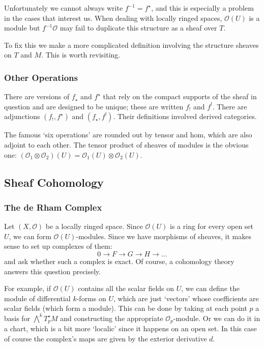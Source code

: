 \documentclass[oneside,english]{amsbook}
\numberwithin{section}{chapter}
\theoremstyle{plain}
\theoremstyle{definition}
\begin{document}
Unfortunately we cannot always write $f^{-1} = f^\star$, and this is especially a problem in the cases that interest us. When dealing with locally ringed spaces, $\mathscr{O}(U)$ is a module but $f^{-1}\mathscr{O}$ may fail to duplicate this structure as a sheaf over $T$.

To fix this we make a more complicated definition involving the structure sheaves on $T$ and $M$. This is worth revisiting.

\subsubsection{Other Operations}

There are versions of $f_\star$ and $f^\star$ that rely on the compact supports of the sheaf in question and are designed to be unique; these are written $f_!$ and $f^!$. There are adjunctions $(f_!, f^\star)$ and $(f_\star, f^!)$. Their definitions involved derived categories.

The famous `six operations' are rounded out by tensor and hom, which are also adjoint to each other. The tensor product of sheaves of modules is the obvious one: $(\mathscr{O}_1\otimes\mathscr{O}_2)(U) = \mathscr{O}_1(U)\otimes\mathscr{O}_2(U)$. 

\subsection{Sheaf Cohomology}

\subsubsection{The de Rham Complex}

Let $(X, \mathscr{O})$ be a locally ringed space. Since $\mathscr{O}(U)$ is a ring for every open set $U$, we can form $\mathscr{O}(U)$-modules. Since we have morphisms of sheaves, it makes sense to set up complexes of them:
\[
	0\to F\to G\to H\to ...
\]
and ask whether such a complex is exact. Of course, a cohomology theory answers this question precisely.

For example, if $\mathscr{O}(U)$ contains all the scalar fields on $U$, we can define the module of differential $k$-forms on $U$, which are just `vectors' whose coefficients are scalar fields (which form a module). This can be done by taking at each point $p$ a basis for $\bigwedge^k T_p^\star M$ and constructing the appropriate $\mathscr{O}_p$-module. Or we can do it in a chart, which is a bit more `localic' since it happens on an open set. In this case of course the complex's maps are given by the exterior derivative $d$.
\end{document}
